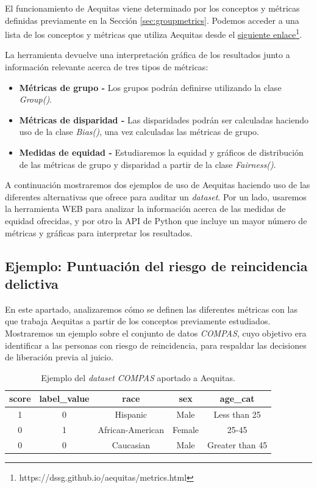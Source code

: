 El funcionamiento de Aequitas viene determinado por los conceptos y métricas definidas previamente en la Sección \ref{sec:groupmetrics}. Podemos acceder a una lista de los conceptos y métricas que utiliza Aequitas desde el \href{https://dssg.github.io/aequitas/metrics.html}{siguiente enlace}\footnote{https://dssg.github.io/aequitas/metrics.html}.

La herramienta devuelve una interpretación gráfica de los resultados junto a información relevante acerca de tres tipos de métricas:

\begin{itemize}
    \item \textbf{Métricas de grupo -} Los grupos podrán definirse utilizando la clase \textit{Group()}.
    \item \textbf{Métricas de disparidad -} Las disparidades podrán ser calculadas haciendo uso de la clase \textit{Bias()}, una vez calculadas las métricas de grupo.
    \item \textbf{Medidas de equidad -} Estudiaremos la equidad y gráficos de distribución de las métricas de grupo y disparidad a partir de la clase \textit{Fairness()}.
\end{itemize}

A continuación mostraremos dos ejemplos de uso de Aequitas haciendo uso de las diferentes alternativas que ofrece para auditar un \textit{dataset}. Por un lado, usaremos la herramienta WEB para analizar la información acerca de las medidas de equidad ofrecidas, y por otro la API de Python que incluye un mayor número de métricas y gráficas para interpretar los resultados.

\subsection{Ejemplo: Puntuación del riesgo de reincidencia delictiva}

En este apartado, analizaremos cómo se definen las diferentes métricas con las que trabaja Aequitas a partir de los conceptos previamente estudiados. Mostraremos un ejemplo sobre el conjunto de datos \textit{COMPAS}, cuyo objetivo era identificar a las personas con riesgo de reincidencia, para respaldar las decisiones de liberación previa al juicio.\\

\begin{table}[h]
\centering
\resizebox{12.4cm}{!} {
\begin{tabular}{|c|c|c|c|c|}
\hline
\textbf{score} & \textbf{label\_value} & \textbf{race}    & \textbf{sex} & \textbf{age\_cat} \\ \hline
1            & 0                     & Hispanic & Male       & Less than 25             \\ \hline
0              & 1                     & African-American         & Female         & 25-45     \\ \hline
0              & 0                     & Caucasian       & Male         & Greater than 45            \\ \hline
\end{tabular}
}
\caption{Ejemplo del \textit{dataset COMPAS} aportado a Aequitas.}
\label{tab:ejcompasaeq}
\end{table}

